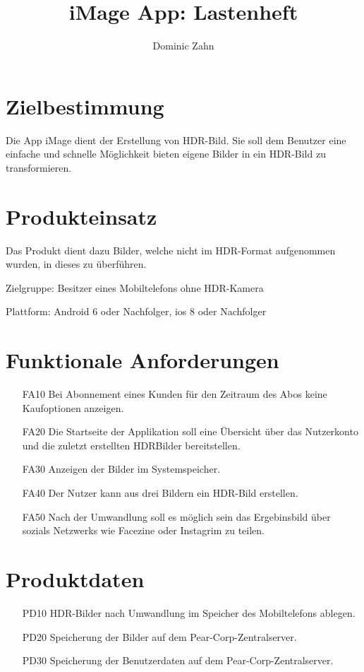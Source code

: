 \documentclass[parskip=full]{scrartcl}
\title{iMage App: Lastenheft}
\author{Dominic Zahn}
\begin{document}
\maketitle

\section{Zielbestimmung}
Die \gls{App} iMage dient der Erstellung von \gls{HDR-Bild}. Sie soll dem Benutzer eine einfache und
schnelle Möglichkeit bieten eigene Bilder in ein \gls{HDR-Bild} zu transformieren.

\section{Produkteinsatz}
Das Produkt dient dazu Bilder, welche nicht im HDR-Format aufgenommen wurden, in dieses zu überführen.

Zielgruppe: Besitzer eines Mobiltelefons ohne HDR-Kamera

Plattform: Android 6 oder Nachfolger, ios 8 oder Nachfolger

\section{Funktionale Anforderungen}
\begin{itemize}[nosep]
\item[FA10] Bei Abonnement eines Kunden für den Zeitraum des Abos keine Kaufoptionen anzeigen.
\item[FA20] Die Startseite der Applikation soll eine Übersicht über das Nutzerkonto und die zuletzt erstellten HDRBilder
bereitstellen.
\item[FA30] Anzeigen der Bilder im \gls{Systemspeicher}.
\item[FA40] Der Nutzer kann aus drei Bildern ein \gls{HDR-Bild} erstellen.
\item[FA50] Nach der Umwandlung soll es möglich sein das Ergebinsbild über \glspl{sozials Netzwerk} wie Facezine oder Instagrim
zu teilen.
\end{itemize}

\section{Produktdaten}
\begin{itemize}[nosep]
\item[PD10] HDR-Bilder nach Umwandlung im Speicher des Mobiltelefons ablegen.
\item[PD20] Speicherung der Bilder auf dem Pear-Corp-Zentralserver.
\item[PD30] Speicherung der Benutzerdaten auf dem Pear-Corp-Zentralserver.
\end{itemize}
\end{document}
